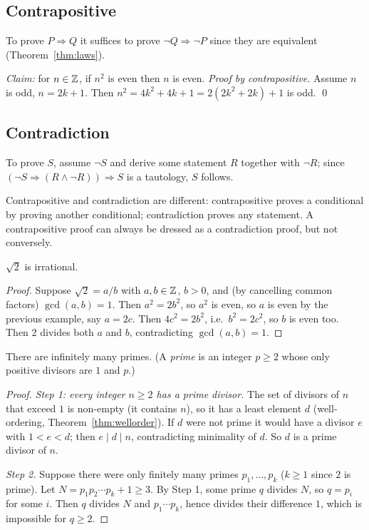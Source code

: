 \subsection{Contrapositive}
To prove $P\Rightarrow Q$ it suffices to prove $\neg Q\Rightarrow\neg P$ since they are equivalent (Theorem~\ref{thm:laws}).
\begin{example}
	\textit{Claim:} for $n\in\mathbb{Z}$, if $n^2$ is even then $n$ is even. \emph{Proof by contrapositive.} Assume $n$ is odd, $n=2k+1$. Then $n^2=4k^2+4k+1=2(2k^2+2k)+1$ is odd. \qed
\end{example}

\subsection{Contradiction}
To prove $S$, assume $\neg S$ and derive some statement $R$ together with $\neg R$; since $(\neg S\Rightarrow(R\wedge\neg R))\Rightarrow S$ is a tautology, $S$ follows.

\begin{warning}
	Contrapositive and contradiction are different: contrapositive proves a conditional by proving another conditional; contradiction proves any statement. A contrapositive proof can always be dressed as a contradiction proof, but not conversely.
\end{warning}

\begin{theorem}\label{thm:sqrt2}
	$\sqrt2$ is irrational.
\end{theorem}
\begin{proof}
	Suppose $\sqrt2=a/b$ with $a,b\in\mathbb{Z}$, $b>0$, and (by cancelling common factors) $\gcd(a,b)=1$. Then $a^2=2b^2$, so $a^2$ is even, so $a$ is even by the previous example, say $a=2c$. Then $4c^2=2b^2$, i.e.\ $b^2=2c^2$, so $b$ is even too. Then $2$ divides both $a$ and $b$, contradicting $\gcd(a,b)=1$.
\end{proof}

\begin{theorem}[Euclid]\label{thm:euclid}
	There are infinitely many primes. (A \emph{prime} is an integer $p\ge2$ whose only positive divisors are $1$ and $p$.)
\end{theorem}
\begin{proof}
	\emph{Step 1: every integer $n\ge2$ has a prime divisor.} The set of divisors of $n$ that exceed $1$ is non-empty (it contains $n$), so it has a least element $d$ (well-ordering, Theorem~\ref{thm:wellorder}). If $d$ were not prime it would have a divisor $e$ with $1<e<d$; then $e\mid d\mid n$, contradicting minimality of $d$. So $d$ is a prime divisor of $n$.
	
	\emph{Step 2.} Suppose there were only finitely many primes $p_1,\dots,p_k$ ($k\ge1$ since $2$ is prime). Let $N=p_1p_2\cdots p_k+1\ge3$. By Step 1, some prime $q$ divides $N$, so $q=p_i$ for some $i$. Then $q$ divides $N$ and $p_1\cdots p_k$, hence divides their difference $1$, which is impossible for $q\ge2$.
\end{proof}

